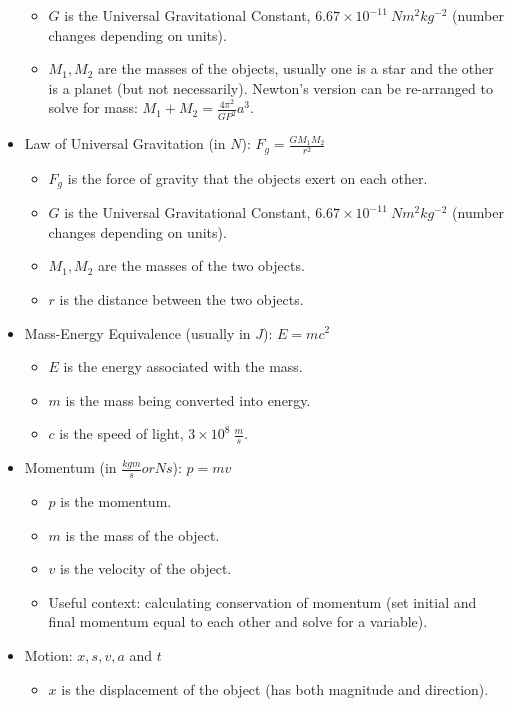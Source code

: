 \documentclass[letterpaper,14pt]{extarticle}
\begin{document}
\begin{itemize}
\begin{itemize}
        \item $G$ is the Universal Gravitational Constant, $6.67 \times 10^{-11}\ Nm^2kg^{-2}$ (number changes depending on units).
        \item $M_1, M_2$ are the masses of the objects, usually one is a star and the other is a planet (but not necessarily). Newton's version can be re-arranged to solve for mass: $M_1 + M_2 = \frac{4\pi^2}{GP^2}a^3$.
    \end{itemize}
    \pagebreak
    \item Law of Universal Gravitation (in $N$): $F_g = \frac{GM_1M_2}{r^2}$
    \begin{itemize}
        \item $F_g$ is the force of gravity that the objects exert on each other.
        \item $G$ is the Universal Gravitational Constant, $6.67 \times 10^{-11}\ Nm^2kg^{-2}$ (number changes depending on units).
        \item $M_1, M_2$ are the masses of the two objects.
        \item $r$ is the distance between the two objects.
    \end{itemize}
    \item Mass-Energy Equivalence (usually in $J$): $E = mc^2$
    \begin{itemize}
        \item $E$ is the energy associated with the mass.
        \item $m$ is the mass being converted into energy.
        \item $c$ is the speed of light, $3 \times 10^8\ \frac{m}{s}$.
    \end{itemize}
    \item Momentum (in $\frac{kgm}{s} or Ns$): $p = mv$
    \begin{itemize}
        \item $p$ is the momentum.
        \item $m$ is the mass of the object.
        \item $v$ is the velocity of the object.
        \item Useful context: calculating conservation of momentum (set initial and final momentum equal to each other and solve for a variable).
    \end{itemize}
    \item Motion: $x, s, v, a$ and $t$
    \begin{itemize}
        \item $x$ is the displacement of the object (has both magnitude and direction).

\end{itemize}
\end{itemize}
\end{document}
